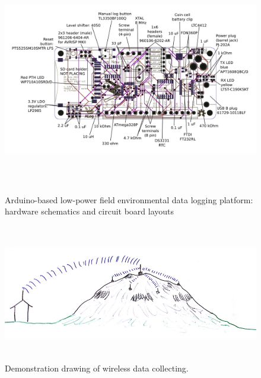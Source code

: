 \begin{figure}
\centering
\includegraphics[height=10cm]{graphics/ALog_drawing}
\caption{Arduino-based low-power field environmental data logging platform: hardware schematics and circuit board layouts\label{fig:BottleLog}\cite{ALog-BottleLogger}}
\end{figure}

\begin{figure}
		\centering
        \includegraphics[height=6cm]{graphics/GeoLog.PNG}
        \caption{Demonstration drawing of wireless data collecting.}
        \label{fig:datalogging}
\end{figure}
